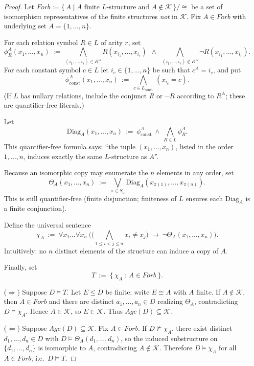 \begin{proof}
    Let $ Forb:=\{\,A\mid A \text{ finite $L$-structure and } A\notin\mathcal K\,\}/\cong$
    be a set of isomorphism representatives of the finite structures \emph{not} in $\mathcal K$.
    Fix $A\in Forb$ with underlying set $A=\{1,\dots,n\}$.


    For each relation symbol $R\in L$ of arity $r$, set
    \[
        \phi^A_R(x_1,\dots,x_n)\ :=\
        \bigwedge_{(i_1,\dots,i_r)\in R^A} R(x_{i_1},\dots,x_{i_r})
        \ \ \wedge\ \
        \bigwedge_{(i_1,\dots,i_r)\notin R^A} \neg R(x_{i_1},\dots,x_{i_r}).
    \]
    For each constant symbol $c\in L$ let $i_c\in\{1,\dots,n\}$ be such that $c^A=i_c$, and put
    \[
        \phi^A_{\mathrm{const}}(x_1,\dots,x_n)\ :=\ \bigwedge_{c\in L_{\mathrm{const}}}\ (x_{i_c}=c).
    \]
    (If $L$ has nullary relations, include the conjunct $R$ or $\neg R$ according to $R^A$; these
    are quantifier-free literals.)

    Let
    \[
        \mathrm{Diag}_A(x_1,\dots,x_n)\ :=\ \phi^A_{\mathrm{const}} \ \wedge\ \bigwedge_{R\in L}\phi^A_R.
    \]
    This quantifier-free formula says: “the tuple $(x_1,\dots,x_n)$, listed in the order
    $1,\dots,n$, induces exactly the same $L$-structure as $A$”.


    Because an isomorphic copy may enumerate the $n$ elements in any order, set
    \[
        \Theta_A(x_1,\dots,x_n)\ :=\ \bigvee_{\pi\in S_n} \mathrm{Diag}_A(x_{\pi(1)},\dots,x_{\pi(n)}).
    \]
    This is still quantifier-free (finite disjunction; finiteness of $L$ ensures each
    $\mathrm{Diag}_A$ is a finite conjunction).


    Define the universal sentence
    \[
        \chi_A\ :=\ \forall x_1\dots\forall x_n\
        \Big( \big(\!\bigwedge_{1\le i<j\le n} x_i\neq x_j\big)\ \rightarrow\ \neg \Theta_A(x_1,\dots,x_n)\Big).
    \]
    Intuitively: no $n$ distinct elements of the structure can induce a copy of $A$.


    Finally, set
    \[
        T\ :=\ \{\ \chi_A\ :\ A\in Forb\ \}.
    \]


    ($\Rightarrow$) Suppose $D\models T$. Let $E\le D$ be finite; write $E\cong A$ with $A$ finite.
    If $A\notin\mathcal K$, then $A\in Forb$ and there are distinct $a_1,\dots,a_n\in D$
    realizing $\Theta_A$, contradicting $D\models\chi_A$. Hence $A\in\mathcal K$, so $E\in\mathcal K$.
    Thus $Age(D)\subseteq\mathcal K$.

    ($\Leftarrow$) Suppose $Age(D)\subseteq\mathcal K$. Fix $A\in Forb$. If $D\not\models\chi_A$,
    there exist distinct $d_1,\dots,d_n\in D$ with $D\models\Theta_A(d_1,\dots,d_n)$, so the induced
    substructure on $\{d_1,\dots,d_n\}$ is isomorphic to $A$, contradicting $A\notin\mathcal K$.
    Therefore $D\models\chi_A$ for all $A\in Forb$, i.e.\ $D\models T$.
\end{proof}


